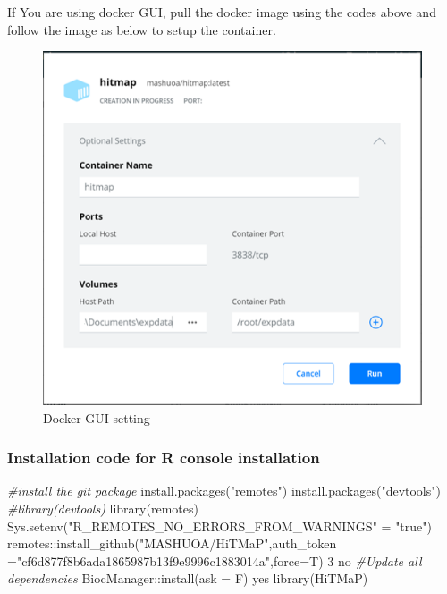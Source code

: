 \documentclass[
]{article}
\newenvironment{Shaded}{\begin{snugshade}}{\end{snugshade}}
\newcommand{\AttributeTok}[1]{\textcolor[rgb]{0.77,0.63,0.00}{#1}}
\newcommand{\CommentTok}[1]{\textcolor[rgb]{0.56,0.35,0.01}{\textit{#1}}}
\newcommand{\DecValTok}[1]{\textcolor[rgb]{0.00,0.00,0.81}{#1}}
\newcommand{\FunctionTok}[1]{\textcolor[rgb]{0.00,0.00,0.00}{#1}}
\newcommand{\NormalTok}[1]{#1}
\newcommand{\OtherTok}[1]{\textcolor[rgb]{0.56,0.35,0.01}{#1}}
\newcommand{\SpecialCharTok}[1]{\textcolor[rgb]{0.00,0.00,0.00}{#1}}
\newcommand{\StringTok}[1]{\textcolor[rgb]{0.31,0.60,0.02}{#1}}
\begin{document}
If You are using docker GUI, pull the docker image using the codes above
and follow the image as below to setup the container.

\begin{figure}
\centering
\includegraphics{Resource/docker_gui_setting.png}
\caption{Docker GUI setting}
\end{figure}

\hypertarget{installation-code-for-r-console-installation}{%
\subsubsection{Installation code for R console
installation}\label{installation-code-for-r-console-installation}}

\begin{Shaded}
\begin{Highlighting}[]
\CommentTok{\#install the git package}
\FunctionTok{install.packages}\NormalTok{(}\StringTok{"remotes"}\NormalTok{)}
\FunctionTok{install.packages}\NormalTok{(}\StringTok{"devtools"}\NormalTok{)}
\CommentTok{\#library(devtools)}
\FunctionTok{library}\NormalTok{(remotes)}
\FunctionTok{Sys.setenv}\NormalTok{(}\StringTok{"R\_REMOTES\_NO\_ERRORS\_FROM\_WARNINGS"} \OtherTok{=} \StringTok{"true"}\NormalTok{)}
\NormalTok{remotes}\SpecialCharTok{::}\FunctionTok{install\_github}\NormalTok{(}\StringTok{"MASHUOA/HiTMaP"}\NormalTok{,}\AttributeTok{auth\_token =}\StringTok{"cf6d877f8b6ada1865987b13f9e9996c1883014a"}\NormalTok{,}\AttributeTok{force=}\NormalTok{T)}
\DecValTok{3}
\NormalTok{no}
\CommentTok{\#Update all dependencies}
\NormalTok{BiocManager}\SpecialCharTok{::}\FunctionTok{install}\NormalTok{(}\AttributeTok{ask =}\NormalTok{ F)}
\NormalTok{yes}
\FunctionTok{library}\NormalTok{(HiTMaP)}
\end{Highlighting}
\end{Shaded}
\end{document}
